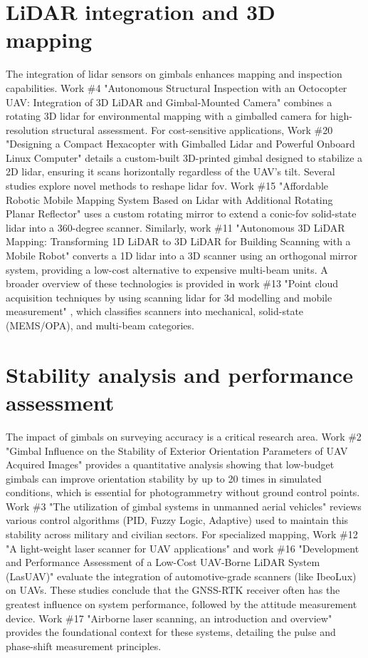 \section{LiDAR integration and 3D mapping}

The integration of \gls{lidar} sensors on gimbals enhances mapping and inspection capabilities.
Work \#4 "Autonomous Structural Inspection with an Octocopter UAV: Integration
of 3D LiDAR and Gimbal-Mounted Camera" \cite{rel4} combines a rotating 3D \gls{lidar} for
environmental mapping with a gimballed camera for
high-resolution structural assessment. For cost-sensitive applications, Work \#20
"Designing a Compact Hexacopter with Gimballed Lidar
and Powerful Onboard Linux Computer" \cite{rel20} details a custom-built 3D-printed
gimbal designed
to stabilize a 2D \gls{lidar}, ensuring it scans horizontally regardless of the UAV's tilt.
Several studies explore novel methods to reshape \gls{lidar} \gls{fov}. Work \#15 "Affordable Robotic
Mobile Mapping System Based on Lidar with Additional Rotating Planar Reflector"
\cite{rel15} uses a custom
rotating mirror to extend a conic-\gls{fov} solid-state \gls{lidar} into a 360-degree scanner.
Similarly, work \#11 "Autonomous 3D LiDAR Mapping: Transforming 1D
LiDAR to 3D LiDAR for Building Scanning with a
Mobile Robot" \cite{rel11} converts a 1D \gls{lidar} into a 3D scanner using
an orthogonal mirror system, providing a low-cost alternative to expensive multi-beam
units. A broader overview of these technologies is provided in work \#13 "Point cloud
acquisition techniques by using scanning lidar for 3d modelling and mobile measurement"
\cite{rel13}, which
classifies scanners into mechanical, solid-state (MEMS/OPA), and multi-beam categories.

\section{Stability analysis and performance assessment}

The impact of gimbals on surveying accuracy is a critical research area.
Work \#2 "Gimbal Influence on the Stability of Exterior Orientation Parameters of UAV
Acquired Images" \cite{rel2} provides a quantitative analysis showing that low-budget
gimbals can improve orientation stability by up to 20 times in simulated conditions,
which is essential for photogrammetry without ground control points.
Work \#3 "The utilization of gimbal systems in unmanned aerial vehicles" \cite{rel3}
reviews various control algorithms (PID, Fuzzy Logic, Adaptive) used to maintain this
stability across military and civilian sectors.
For specialized mapping, Work \#12 "A light-weight laser scanner for UAV applications"
\cite{rel12} and work \#16 "Development and Performance Assessment of a Low-Cost
UAV-Borne LiDAR System (LasUAV)" \cite{rel16} evaluate the integration of
automotive-grade scanners (like IbeoLux) on UAVs. These studies conclude that the
GNSS-RTK receiver often has the greatest influence on system performance,
followed by the attitude measurement device.
Work \#17 "Airborne laser scanning, an introduction and overview" \cite{rel17} provides
the foundational context for these systems, detailing the pulse and phase-shift
measurement principles.

